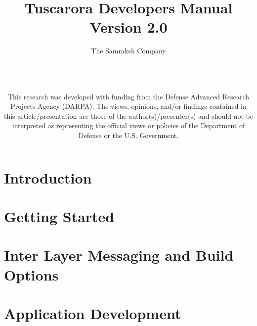 \documentclass[letterpaper,
 12pt,
 titlepage,
 oneside,
 openany,			%
 headinclude,    %
 headsepline,    %
 footsepline=false, %
 appendixprefix=true,
 chapterprefix=true,   
 index= totoc,        %
 bibliography=openstyle,
 bibliography    = totoc         %
]{book}
\newcommand{\+}{\discretionary{\mbox{\scriptsize$\hookleftarrow$}}{}{}}
\begin{document}
\title{Tuscarora Developers Manual\\
 Version 2.0 \\
}
\author{The Samraksh Company\\
	\\
	\\
	\\}
\date{This research was developed with funding from the Defense Advanced Research Projects Agency (DARPA). The views, opinions, and/or findings contained in this article/presentation are those of the author(s)/presenter(s) and should not be interpreted as representing the official views or policies of the Department of Defense or the U.S. Government.}



\maketitle
\tableofcontents{}


\chapter {Introduction}
\label{Chap:Intro}


\chapter {Getting Started}
\label{Chap:Install}


\chapter{Inter Layer Messaging and Build Options}
\label{Chap:ILS}

%

\chapter{Application Development}
\label{Chap:Architecture}

\end{document}
